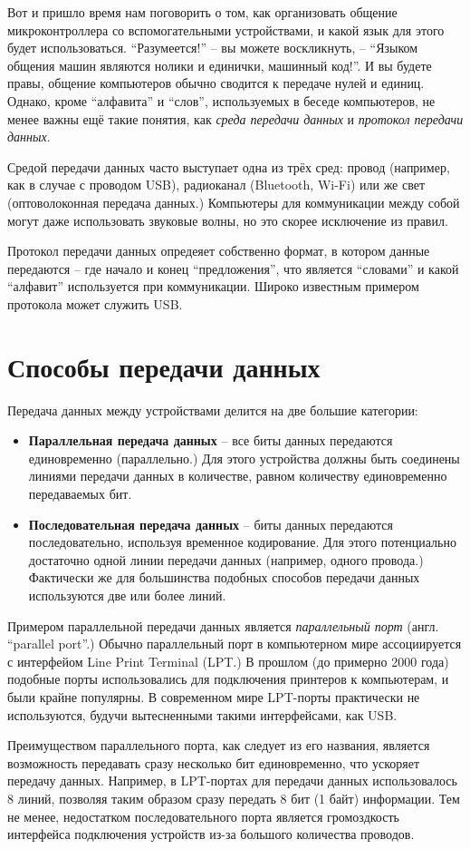 \documentclass[../sparc.tex]{subfiles}
\begin{document}
Вот и пришло время нам поговорить о том, как организовать общение
микроконтроллера со вспомогательными устройствами, и какой язык для этого будет
использоваться.  ``Разумеется!'' -- вы можете воскликнуть, -- ``Языком общения
машин являются нолики и единички, машинный код!''.  И вы будете правы, общение
компьютеров обычно сводится к передаче нулей и единиц.  Однако, кроме
``алфавита'' и ``слов'', используемых в беседе компьютеров, не менее важны ещё
такие понятия, как \emph{среда передачи данных} и \emph{протокол передачи
данных}.

Средой передачи данных часто выступает одна из трёх сред: провод (например, как
в случае с проводом USB), радиоканал (Bluetooth, Wi-Fi) или же свет
(оптоволоконная передача данных.)  Компьютеры для коммуникации между собой могут
даже использовать звуковые волны, но это скорее исключение из правил.

Протокол передачи данных опредеяет собственно формат, в котором данные
передаются -- где начало и конец ``предложения'', что является ``словами'' и
какой ``алфавит'' используется при коммуникации.  Широко известным примером
протокола может служить USB.

\section{Способы передачи данных}

Передача данных между устройствами делится на две большие категории:

\begin{itemize}
\item \textbf{Параллельная передача данных} -- все биты данных передаются
  единовременно (параллельно.)  Для этого устройства должны быть соединены
  линиями передачи данных в количестве, равном количеству единовременно
  передаваемых бит.
\item \textbf{Последовательная передача данных} -- биты данных передаются
  последовательно, используя временное кодирование.  Для этого потенциально
  достаточно одной линии передачи данных (например, одного провода.)  Фактически
  же для большинства подобных способов передачи данных используются две или
  более линий.
\end{itemize}

Примером параллельной передачи данных является \emph{параллельный порт}
(англ. ``parallel port''.)  Обычно параллельный порт в компьютерном мире
ассоциируется с интерфейом Line Print Terminal (LPT.)  В прошлом (до примерно
2000 года) подобные порты использовались для подключения принтеров к
компьютерам, и были крайне популярны.  В современном мире LPT-порты практически
не используются, будучи вытесненными такими интерфейсами, как USB.

Преимуществом параллельного порта, как следует из его названия, является
возможность передавать сразу несколько бит единовременно, что ускоряет передачу
данных.  Например, в LPT-портах для передачи данных использовалось 8 линий,
позволяя таким образом сразу передать 8 бит (1 байт) информации.  Тем не менее,
недостатком последовательного порта является громоздкость интерфейса подключения
устройств из-за большого количества проводов.
\end{document}
